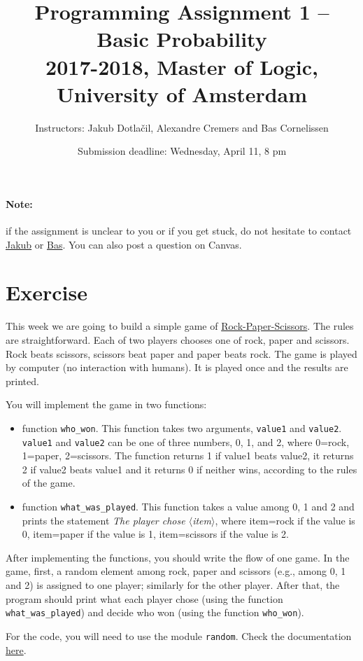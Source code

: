 \documentclass[11pt, a4paper]{article}
\title{Programming Assignment 1 -- Basic Probability\\[2mm]
\large{2017-2018, Master of Logic, University of Amsterdam}}
\author{Instructors: Jakub Dotla\v{c}il, Alexandre Cremers and Bas Cornelissen}
\date{Submission deadline: Wednesday, April 11, 8 pm}
\newcommand{\angles}[1]{$\langle$#1$\rangle$}
\begin{document}
\maketitle

\paragraph{Note:} if the assignment is unclear to you or if you get stuck, do not hesitate to contact \href{mailto:j.dotlacil@uva.nl}{Jakub} or \href{mailto:bjmcornelissen@gmail.com}{Bas}. You can also post a question on Canvas.

\section{Exercise}
This week we are going to build a simple game of \href{https://en.wikipedia.org/wiki/Rock-paper-scissors}{Rock-Paper-Scissors}. The rules are straightforward. Each of two players chooses one of rock, paper and scissors. Rock beats scissors, scissors beat paper and paper beats rock. The game is played by computer (no interaction with humans). It is played once and the results are printed.

You will implement the game in two functions:
\begin{itemize}
    \item function \texttt{who\_won}. This function takes two arguments, \texttt{value1} and \texttt{value2}. \texttt{value1} and \texttt{value2} can be one of three numbers, 0, 1, and 2, where 0=rock, 1=paper, 2=scissors. The function returns 1 if value1 beats value2, it returns 2 if value2 beats value1 and it returns 0 if neither wins, according to the rules of the game.
    \item function \texttt{what\_was\_played}. This function takes a value among 0, 1 and 2 and prints the statement \textit{The player chose \angles{item}}, where item=rock if the value is 0, item=paper if the value is 1, item=scissors if the value is 2.
\end{itemize}

After implementing the functions, you should write the flow of one game. In the game, first, a random element among rock, paper and scissors (e.g., among 0, 1 and 2) is assigned to one player; similarly for the other player. After that, the program should print what each player chose (using the function \texttt{what\_was\_played}) and decide who won (using the function \texttt{who\_won}).

For the code, you will need to use the module \texttt{random}. Check the documentation \href{https://docs.python.org/3/library/random.html}{here}.
\end{document}
